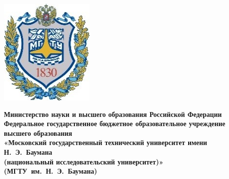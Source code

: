 \newcommand{\fixunderline}[3]
{
	$\underset{\text{#3}}{\text{\uline{\stackengine{0pt}{\hspace{#2}}{\text{#1}}{O}{c}{F}{F}{L}}}}$
}

\begin{titlepage}
	\fontsize{12pt}{12pt}\selectfont
	\noindent \begin{minipage}{0.15\textwidth}
		\includegraphics[width=\linewidth]{img/b_logo.jpg}
	\end{minipage}
	\noindent\begin{minipage}{0.9\textwidth}\centering
		\textbf{Министерство науки и высшего образования Российской Федерации}\\
		\textbf{Федеральное государственное бюджетное образовательное учреждение высшего образования}\\
		\textbf{«Московский государственный технический университет имени Н.~Э.~Баумана}\\
		\textbf{(национальный исследовательский университет)»}\\
		\textbf{(МГТУ~им.~Н.~Э.~Баумана)}
	\end{minipage}
	

\end{titlepage}
